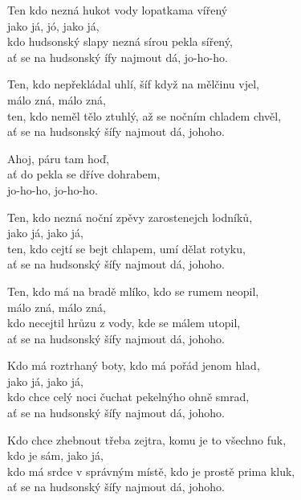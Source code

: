 
\ve{}
Ten kdo nezná hukot vody lopatkama vířený\\
jako já, jó, jako já,\\
kdo hudsonský slapy nezná sírou pekla sířený,\\
ať se na hudsonský ífy najmout dá, \quad {}jo-ho-ho.

\ve{}
Ten, kdo nepřekládal uhlí, šíf když na mělčinu vjel,\\
málo zná, málo zná,\\
ten, kdo neměl tělo ztuhlý, až se nočním chladem chvěl,\\
ať se na hudsonský šífy najmout dá, johoho.

\cho{}
Ahoj, páru tam hoď,\\
ať do pekla se dříve dohrabem,\\
jo-ho-ho, \quad {}jo-ho-ho.

\ve{}
Ten, kdo nezná noční zpěvy zarostenejch lodníků,\\
jako já, jako já,\\
ten, kdo cejtí se bejt chlapem, umí dělat rotyku,\\
ať se na hudsonský šífy najmout dá, johoho.

\ve{}
Ten, kdo má na bradě mlíko, kdo se rumem neopil, \\
málo zná, málo zná,\\
kdo necejtil hrůzu z vody, kde se málem utopil,\\
ať se na hudsonský šífy najmout dá, johoho.

\cho{}

\ve{}
Kdo má roztrhaný boty, kdo má pořád jenom hlad,\\
jako já, jako já,\\
kdo chce celý noci čuchat pekelnýho ohně smrad,\\
ať se na hudsonský šífy najmout dá, johoho.

\ve{}
Kdo chce zhebnout třeba zejtra, komu je to všechno fuk,\\
kdo je sám, jako já,\\
kdo má srdce v správným místě, kdo je prostě prima kluk,\\
ať se na hudsonský šífy najmout dá, johoho.

\cho{}

\esong